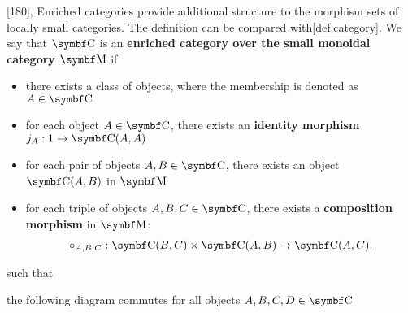 \begin{definition}\label{def:enriched_category}\cite{MacLane1994}[180],\cite{nLab:enriched_category}
  Enriched categories provide additional structure to the morphism sets of locally small categories. The definition can be compared with\cref{def:category}. We say that \( \Bold C \) is an \textbf{enriched category over the small monoidal category \( \Bold M \)} if
  \begin{itemize}
    \item there exists a class of objects, where the membership is denoted as \( A \in \Bold C \)
    \item for each object \( A \in \Bold C \), there exists an \textbf{identity morphism} \( j_A: 1 \to \Bold{C}(A, A) \)
    \item for each pair of objects \( A, B \in \Bold C \), there exists an object \( \Bold{C}(A, B) \) in \( \Bold M \)
    \item for each triple of objects \( A, B, C \in \Bold C \), there exists a \textbf{composition morphism} in \( \Bold M \):
    \begin{align*}
      \circ_{A,B,C}: {\Bold C}(B, C) \times {\Bold C}(A, B) \to {\Bold C}(A, C).
    \end{align*}
  \end{itemize}
  such that
  \begin{defenum}
    \item the following diagram commutes for all objects \( A, B, C, D \in \Bold C \)
    \begin{Center}
    \end{Center}


\end{defenum}
\end{definition}
